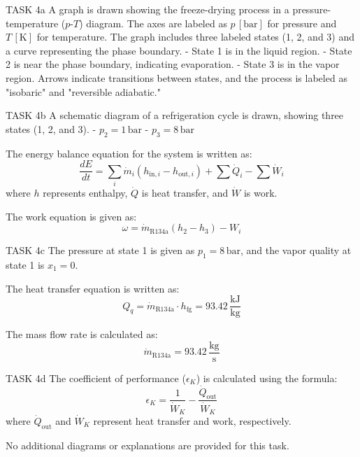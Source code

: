 TASK 4a  
A graph is drawn showing the freeze-drying process in a pressure-temperature (\( p \)-\( T \)) diagram. The axes are labeled as \( p \, [\text{bar}] \) for pressure and \( T \, [\text{K}] \) for temperature. The graph includes three labeled states (1, 2, and 3) and a curve representing the phase boundary.  
- State 1 is in the liquid region.  
- State 2 is near the phase boundary, indicating evaporation.  
- State 3 is in the vapor region.  
Arrows indicate transitions between states, and the process is labeled as "isobaric" and "reversible adiabatic."  

TASK 4b  
A schematic diagram of a refrigeration cycle is drawn, showing three states (1, 2, and 3).  
- \( p_2 = 1 \, \text{bar} \)  
- \( p_3 = 8 \, \text{bar} \)  

The energy balance equation for the system is written as:  
\[
\frac{dE}{dt} = \sum_i \dot{m}_i \left( h_{\text{in},i} - h_{\text{out},i} \right) + \sum \dot{Q}_i - \sum \dot{W}_i
\]  
where \( h \) represents enthalpy, \( \dot{Q} \) is heat transfer, and \( \dot{W} \) is work.  

The work equation is given as:  
\[
\omega = \dot{m}_{\text{R134a}} \left( h_2 - h_3 \right) - W_i
\]  

TASK 4c  
The pressure at state 1 is given as \( p_1 = 8 \, \text{bar} \), and the vapor quality at state 1 is \( x_1 = 0 \).  

The heat transfer equation is written as:  
\[
Q_q = \dot{m}_{\text{R134a}} \cdot h_{\text{fg}} = 93.42 \, \frac{\text{kJ}}{\text{kg}}
\]  

The mass flow rate is calculated as:  
\[
\dot{m}_{\text{R134a}} = 93.42 \, \frac{\text{kg}}{\text{s}}
\]  

TASK 4d  
The coefficient of performance (\( \epsilon_K \)) is calculated using the formula:  
\[
\epsilon_K = \frac{1}{\dot{W}_K} - \frac{\dot{Q}_{\text{out}}}{\dot{W}_K}  
\]  
where \( \dot{Q}_{\text{out}} \) and \( \dot{W}_K \) represent heat transfer and work, respectively.  

No additional diagrams or explanations are provided for this task.